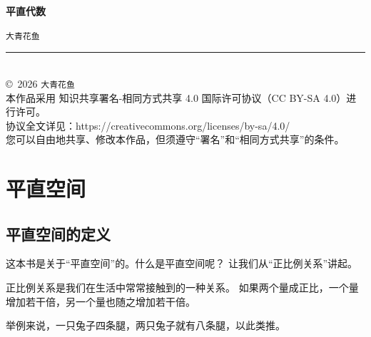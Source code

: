 \documentclass[12pt,UTF8]{ctexbook}
\newcommand{\mytitle}{平直代数}
\newcommand{\myauthor}{大青花鱼}
\begin{document}
\cleardoublepage                %
\thispagestyle{empty}           %
\begin{center}
    \vspace*{2cm}               %
    
    { \bfseries \mytitle}
    
    \vspace{1cm}              %
    
    { \texttt{\myauthor}}
    
    \vfill                      %
    
    \rule{0.5\textwidth}{0.4pt} \\[0.5cm]
    
    {\scriptsize
    \copyright\ 2026 \texttt{\myauthor} \\[0.2cm]
    本作品采用 知识共享署名-相同方式共享 4.0 国际许可协议（CC BY-SA 4.0）进行许可。\\
    协议全文详见：https://creativecommons.org/licenses/by-sa/4.0/ \\
    您可以自由地共享、修改本作品，但须遵守“署名”和“相同方式共享”的条件。
    }
    
\end{center}
\newpage   

\tableofcontents
\newpage

\chapter{平直空间}
\section{平直空间的定义}
这本书是关于“平直空间”的。什么是平直空间呢？
让我们从“正比例关系”讲起。

正比例关系是我们在生活中常常接触到的一种关系。
如果两个量成正比，一个量增加若干倍，另一个量也随之增加若干倍。

举例来说，一只兔子四条腿，两只兔子就有八条腿，以此类推。
\end{document}
